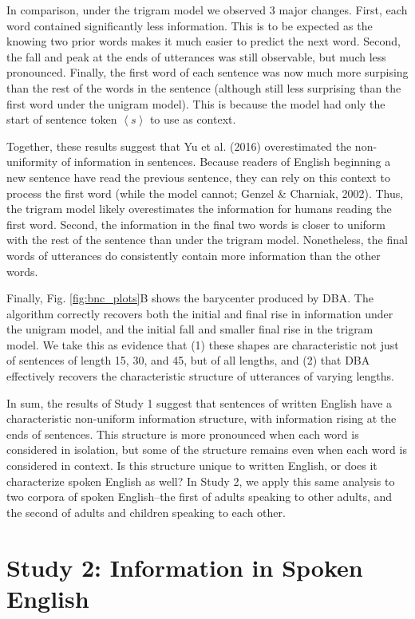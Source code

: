 \documentclass[10pt, letterpaper]{article}
\begin{document}
In comparison, under the trigram model we observed 3 major changes.
First, each word contained significantly less information. This is to be
expected as the knowing two prior words makes it much easier to predict
the next word. Second, the fall and peak at the ends of utterances was
still observable, but much less pronounced. Finally, the first word of
each sentence was now much more surpising than the rest of the words in
the sentence (although still less surprising than the first word under
the unigram model). This is because the model had only the start of
sentence token \(\left<s\right>\) to use as context.

Together, these results suggest that Yu et al. (2016) overestimated the
non-uniformity of information in sentences. Because readers of English
beginning a new sentence have read the previous sentence, they can rely
on this context to process the first word (while the model cannot;
Genzel \& Charniak, 2002). Thus, the trigram model likely overestimates
the information for humans reading the first word. Second, the
information in the final two words is closer to uniform with the rest of
the sentence than under the trigram model. Nonetheless, the final words
of utterances do consistently contain more information than the other
words.

Finally, Fig. \ref{fig:bnc_plots}B shows the barycenter produced by DBA.
The algorithm correctly recovers both the initial and final rise in
information under the unigram model, and the initial fall and smaller
final rise in the trigram model. We take this as evidence that (1) these
shapes are characteristic not just of sentences of length 15, 30, and
45, but of all lengths, and (2) that DBA effectively recovers the
characteristic structure of utterances of varying lengths.

In sum, the results of Study 1 suggest that sentences of written English
have a characteristic non-uniform information structure, with
information rising at the ends of sentences. This structure is more
pronounced when each word is considered in isolation, but some of the
structure remains even when each word is considered in context. Is this
structure unique to written English, or does it characterize spoken
English as well? In Study 2, we apply this same analysis to two corpora
of spoken English--the first of adults speaking to other adults, and the
second of adults and children speaking to each other.

\hypertarget{study-2-information-in-spoken-english}{%
\section{Study 2: Information in Spoken
English}\label{study-2-information-in-spoken-english}}
\end{document}
